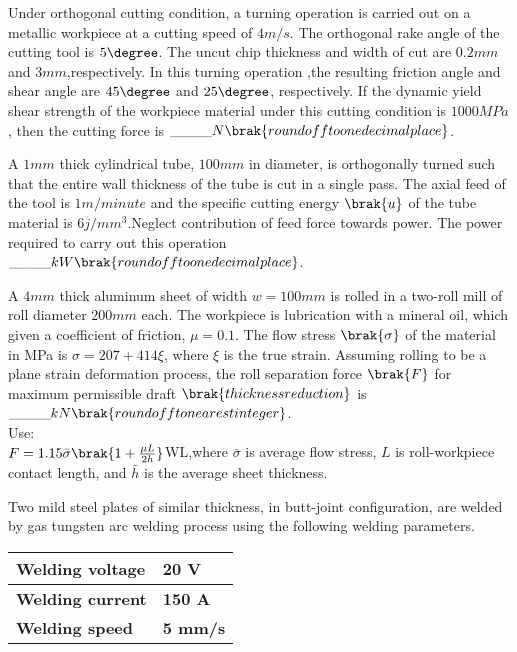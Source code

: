      \item Under orthogonal cutting condition, a turning operation is carried out on a metallic workpiece at a cutting speed of $4 m/s$. The orthogonal rake angle of the  cutting tool is $5\degree$. The uncut chip thickness and width of cut are $0.2 mm$ and $3 mm$,respectively. In this turning operation ,the resulting friction angle and shear angle are $45\degree$ and $25\degree$, respectively. If the dynamic yield shear strength of the workpiece material under this cutting condition is $1000 MPa$, then the cutting force is $\_\_\_\_N\brak{round off to one decimal place}$.\\
     \item A $1 mm$ thick cylindrical tube, $100 mm$ in diameter, is orthogonally turned such that the entire wall thickness of the tube is cut in a single pass. The axial feed of the tool is $1 m/minute$ and the specific cutting energy $\brak{u}$ of the tube material is $6 j/mm^{3}$.Neglect contribution of feed force towards power.  The power required to carry out this operation $\_\_\_\_ kW \brak{round off to one decimal place}$.\\
     \item A $4 mm$ thick aluminum sheet of width $w=100 mm$ is rolled in a two-roll mill of roll diameter $200 mm$ each. The workpiece is lubrication with a mineral oil, which given a coefficient of friction, $\mu=0.1$. The flow stress $\brak{\sigma}$ of the material in MPa is $\sigma=207+ 414 \xi$, where $\xi$ is the true strain. Assuming rolling to be a plane strain deformation process, the roll separation force $\brak{F}$ for maximum permissible draft $\brak{thickness reduction}$ is $\_\_\_\_kN \brak{round off to nearest integer}$.\\
     Use:\\
     $F = 1.15 \Bar{\sigma} \brak{1+\frac{\mu L}{2h}}$WL,where $\bar{\sigma}$ is average flow stress, $L$ is roll-workpiece contact length, and $\bar{h}$ is the average sheet thickness.\\
     \item Two mild steel plates of similar thickness, in butt-joint configuration, are welded by gas tungsten arc welding process using the following welding parameters.\\
\begin{table}[h!]
\centering
\renewcommand{\arraystretch}{1.5}
\begin{tabular}{|m{5cm}|m{3cm}|}
    \hline
    \textbf{Welding voltage} & \textbf{20 V} \\ 
    \hline
    \textbf{Welding current} & \textbf{150 A} \\ 
    \hline
    \textbf{Welding speed} & \textbf{5 mm/s} \\ 
    \hline
\end{tabular}
\end{table}\\
